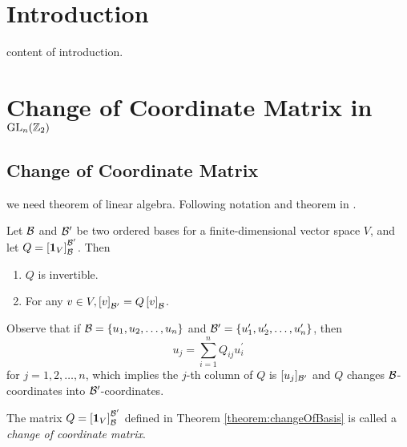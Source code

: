 \section{Introduction}

content of introduction.


\section{Change of Coordinate Matrix in \texorpdfstring{$ \operatorname{GL}_n(\mathbb{Z}_2) $}{GL\_{}n(Z\_{}2)}}

\subsection{Change of Coordinate Matrix}
we need theorem of linear algebra. Following notation and theorem in \cite{Lamport:LaTeX}.

\begin{theorem} \label{theorem:changeOfBasis}
Let $ \mathcal{B} $ and $ \mathcal{B}^\prime $ be two ordered bases for a finite-dimensional vector space $ V $,
and let $ Q = \left[ \mathbf{1}_V \right]_{\mathcal{B}}^{\mathcal{B}^\prime} $. Then
\begin{enumerate}
    \item $ Q $ is invertible.
    \item For any $ v \in V, \left[ v \right]_{\mathcal{B}^\prime} = Q \left[ v \right]_{\mathcal{B}} $.
\end{enumerate}
\end{theorem}

Observe that if $ \mathcal{B} = \left\{ u_1, u_2, \ldots, u_n \right\} $
and $ \mathcal{B}^\prime = \left\{ u_1^\prime, u_2^\prime, \ldots, u_n^\prime \right\} $,
then
\[ u_j = \sum_{i=1}^{n} { Q_{ij} u_i^\prime } \] for $ j = 1, 2, \ldots, n $,
which implies the $ j $-th column of $ Q $ is $ [ u_j ]_{\mathcal{B}^\prime} $ and $ Q $ changes $ \mathcal{B} $-coordinates into $ \mathcal{B}^\prime $-coordinates.

\begin{definition}
The matrix $ Q = \left[ \mathbf{1}_V \right]_{\mathcal{B}}^{\mathcal{B}^\prime} $
defined in Theorem \ref{theorem:changeOfBasis} is called a \textit{change of coordinate matrix}.
\end{definition}

